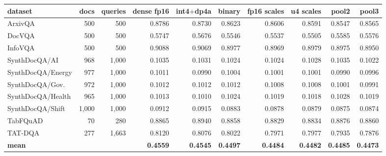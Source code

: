 \begin{tabular}{l r r r r r r r r r }
\toprule
dataset & docs & queries & dense fp16 & int4$+$dp4a & binary & fp16 scales & u4 scales & pool2 & pool3 \\
\midrule
ArxivQA & 500 & 500 & 0.8786 & 0.8730 & 0.8623 & 0.8606 & 0.8591 & 0.8547 & 0.8565 \\
DocVQA & 500 & 500 & 0.5747 & 0.5676 & 0.5546 & 0.5537 & 0.5505 & 0.5585 & 0.5576 \\
InfoVQA & 500 & 500 & 0.9088 & 0.9069 & 0.8977 & 0.8969 & 0.8979 & 0.8975 & 0.8950 \\
SynthDocQA/AI & 968 & 1,000 & 0.1035 & 0.1031 & 0.1024 & 0.1024 & 0.1028 & 0.1035 & 0.1022 \\
SynthDocQA/Energy & 977 & 1,000 & 0.1011 & 0.0990 & 0.1004 & 0.1001 & 0.1001 & 0.0990 & 0.0996 \\
SynthDocQA/Gov. & 972 & 1,000 & 0.1012 & 0.1012 & 0.1012 & 0.1008 & 0.1008 & 0.1001 & 0.0991 \\
SynthDocQA/Health & 965 & 1,000 & 0.1013 & 0.1010 & 0.1024 & 0.1019 & 0.1018 & 0.1028 & 0.1019 \\
SynthDocQA/Shift & 1,000 & 1,000 & 0.0912 & 0.0915 & 0.0883 & 0.0878 & 0.0879 & 0.0875 & 0.0874 \\
TabFQuAD & 70 & 280 & 0.8865 & 0.8940 & 0.8858 & 0.8829 & 0.8834 & 0.8876 & 0.8860 \\
TAT-DQA & 277 & 1,663 & 0.8120 & 0.8076 & 0.8022 & 0.7971 & 0.7977 & 0.7935 & 0.7876 \\
\midrule
\textbf{mean} &  &  & \textbf{0.4559} & \textbf{0.4545} & \textbf{0.4497} & \textbf{0.4484} & \textbf{0.4482} & \textbf{0.4485} & \textbf{0.4473} \\
\bottomrule
\end{tabular}
